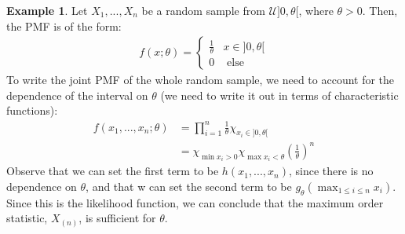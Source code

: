 \documentclass[11pt]{scrartcl}
\theoremstyle{definition}
\newtheorem{ex}{Example}
\theoremstyle{remark}
\begin{document}
{ \begin{ex} 
 	Let $X_1, ..., X_n$ be a random sample from $\mathcal{U} ]0, \theta[$, where $\theta > 0$. Then, the PMF is of the form: 
 	\begin{align*}
 		f(x; \theta) = \begin{cases}
 			\frac{1}{\theta} & x \in ]0, \theta [ \\
 			0 & \text{ else}
 		\end{cases}
 	\end{align*}
 	To write the joint PMF of the whole random sample, we need to account for the dependence of the interval on $\theta$ (we need to write it out in terms of characteristic functions): 
 	\begin{align*}
 		f(x_1, ..., x_n; \theta) & = \prod_{i=1}^n \frac{1}{\theta} \chi_{x_i \in ]0, \theta[}  \\
 			& = \chi_{\min x_i > 0 } \chi_{\max x_i < \theta} \left( \frac{1}{\theta} \right)^n 
 	\end{align*}
 	Observe that we can set the first term to be $h(x_1, ..., x_n)$, since there is no dependence on $\theta$, and that w can set the second term to be $g_\theta (\max_{1 \leq i \leq n} x_i)$. Since this is the likelihood function, we can conclude that the maximum order statistic, $X_{(n)}$, is sufficient for $\theta$. 	
 \end{ex}

}
\end{document}
